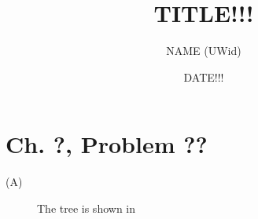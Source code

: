 \documentclass{article}
\title{TITLE!!!}
\author{NAME  (UWid)}
\date{DATE!!!}
\begin{document}
\maketitle

\section*{Ch. ?, Problem ??}
\begin{description}
    \item[(A)] The tree is shown in \label{}
\end{description}
\end{document}

